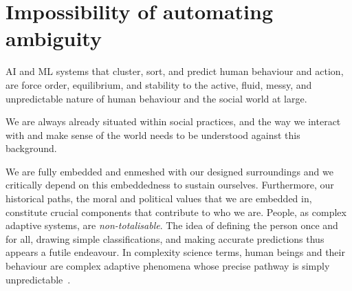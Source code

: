 


\section{Impossibility of automating ambiguity}


AI and ML systems that cluster, sort, and predict human behaviour and action, are force order, equilibrium, and stability to the active, fluid, messy, and unpredictable nature of human behaviour and the social world at large. 

We are always already situated within social practices, and the way we interact with and make sense of the world needs to be understood against this background.

 We are fully embedded and enmeshed with our designed surroundings and we critically depend on this embeddedness to sustain ourselves. Furthermore, our historical paths, the moral and political values that we are embedded in, constitute crucial components that contribute to who we are. People, as complex adaptive systems, are \textit{non-totalisable}. The idea of defining the person once and for all, drawing simple classifications, and making accurate predictions thus appears a futile endeavour. In complexity science terms, human beings and their behaviour are complex adaptive phenomena whose precise pathway is simply unpredictable~\citep{juarrero2000dynamics}.

 


